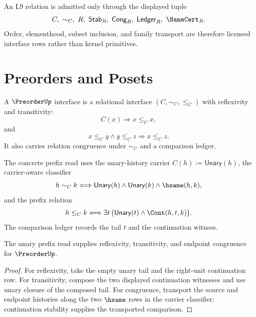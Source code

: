 \begin{principle}
\label{prin:order-set-type-relational-boundary}
An L9 relation is admitted only through the displayed tuple
$$
C,\ \sim_C,\ R,\ \mathsf{Stab}_R,\ \mathsf{Cong}_R,\
\mathsf{Ledger}_R,\ \NameCert_R.
$$
Order, elementhood, subset inclusion, and family transport are therefore
licensed interface rows rather than kernel primitives.
\end{principle}

\section{Preorders and Posets}
\label{sec:order-set-type-preorder-poset}

\begin{definition}
\label{def:order-set-type-preorder}
A $\PreorderUp$ interface is a relational interface
$(C,\sim_C,\le_C)$ with reflexivity and transitivity:
$$
C(x)\Longrightarrow x\le_C x,
$$
and
$$
x\le_C y\wedge y\le_C z\Longrightarrow x\le_C z.
$$
It also carries relation congruence under $\sim_C$ and a comparison ledger.
\end{definition}

\begin{definition}
\label{def:order-set-type-unary-prefix-preorder}
The concrete prefix read uses the unary-history carrier
$C(h):=\mathsf{Unary}(h)$, the carrier-aware classifier
$$
h\sim_C k
\Longleftrightarrow
\mathsf{Unary}(h)\wedge\mathsf{Unary}(k)\wedge\hsame(h,k),
$$
and the prefix relation
$$
h\le_C k
\Longleftrightarrow
\exists t\,
\bigl(\mathsf{Unary}(t)\wedge\Cont(h,t,k)\bigr).
$$
The comparison ledger records the tail $t$ and the continuation witness.
\end{definition}

\begin{theorem}
\label{thm:order-set-type-prefix-preorder-laws}
The unary prefix read supplies reflexivity, transitivity, and endpoint
congruence for $\PreorderUp$.
\end{theorem}

\begin{proof}
For reflexivity, take the empty unary tail and the right-unit continuation
row.  For transitivity, compose the two displayed continuation witnesses and
use unary closure of the composed tail.  For congruence, transport the
source and endpoint histories along the two $\hsame$ rows in the carrier
classifier; continuation stability supplies the transported comparison.
\end{proof}

